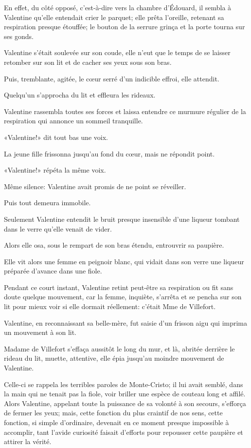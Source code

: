 En effet, du côté opposé, c'est-à-dire vers la chambre d'Édouard, il sembla à Valentine qu'elle entendait crier le parquet; elle prêta l'oreille, retenant sa respiration presque étouffée; le bouton de la serrure grinça et la porte tourna sur ses gonds. 

Valentine s'était soulevée sur son coude, elle n'eut que le temps de se laisser retomber sur son lit et de cacher ses yeux sous son bras. 

Puis, tremblante, agitée, le cœur serré d'un indicible effroi, elle attendit. 

Quelqu'un s'approcha du lit et effleura les rideaux. 

Valentine rassembla toutes ses forces et laissa entendre ce murmure régulier de la respiration qui annonce un sommeil tranquille. 

«Valentine!» dit tout bas une voix. 

La jeune fille frissonna jusqu'au fond du cœur, mais ne répondit point. 

«Valentine!» répéta la même voix. 

Même silence: Valentine avait promis de ne point se réveiller. 

Puis tout demeura immobile. 

Seulement Valentine entendit le bruit presque insensible d'une liqueur tombant dans le verre qu'elle venait de vider. 

Alors elle osa, sous le rempart de son bras étendu, entrouvrir sa paupière. 

Elle vit alors une femme en peignoir blanc, qui vidait dans son verre une liqueur préparée d'avance dans une fiole. 

Pendant ce court instant, Valentine retint peut-être sa respiration ou fit sans doute quelque mouvement, car la femme, inquiète, s'arrêta et se pencha sur son lit pour mieux voir si elle dormait réellement: c'était Mme de Villefort. 

Valentine, en reconnaissant sa belle-mère, fut saisie d'un frisson aigu qui imprima un mouvement à son lit. 

Madame de Villefort s'effaça aussitôt le long du mur, et là, abritée derrière le rideau du lit, muette, attentive, elle épia jusqu'au moindre mouvement de Valentine. 

Celle-ci se rappela les terribles paroles de Monte-Cristo; il lui avait semblé, dans la main qui ne tenait pas la fiole, voir briller une espèce de couteau long et affilé. Alors Valentine, appelant toute la puissance de sa volonté à son secours, s'efforça de fermer les yeux; mais, cette fonction du plus craintif de nos sens, cette fonction, si simple d'ordinaire, devenait en ce moment presque impossible à accomplir, tant l'avide curiosité faisait d'efforts pour repousser cette paupière et attirer la vérité. 

